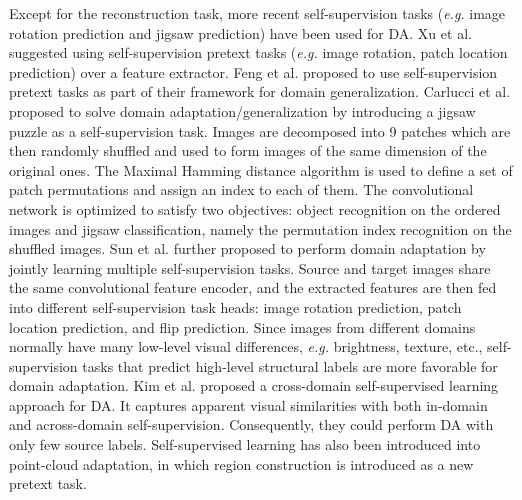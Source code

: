 \documentclass[conference]{IEEEtran}
\begin{document}
Except for the reconstruction task, more recent self-supervision tasks (\textit{e.g.}
image rotation prediction and jigsaw prediction) have been used for DA.
Xu et al. suggested using self-supervision pretext tasks (\textit{e.g.} image rotation, patch 
location prediction) over a feature extractor.
Feng et al. proposed to use self-supervision pretext tasks as part of their framework
for domain generalization. 
Carlucci et al. proposed to solve domain adaptation/generalization by introducing 
a jigsaw puzzle as a self-supervision task. 
Images are decomposed into 9 patches which are then randomly shuffled and used to
form images of the same dimension of the original ones.
The Maximal Hamming distance algorithm is used to define a set of patch 
permutations and assign an index to each of them.
The convolutional network is optimized to satisfy two objectives:
object recognition on the ordered images and jigsaw classification, namely 
the permutation index recognition on the shuffled images.
Sun et al. further proposed to perform domain adaptation by jointly learning 
multiple self-supervision tasks.
Source and target images share the same convolutional feature encoder, 
and the extracted features are then fed into different self-supervision task heads:
image rotation prediction, patch location prediction, and flip prediction.
Since images from different domains normally have many low-level visual differences,
\textit{e.g.} brightness, texture, etc., self-supervision tasks that predict high-level 
structural labels are more favorable for domain adaptation.
Kim et al. proposed a cross-domain self-supervised learning approach 
for DA.
It captures apparent visual similarities with both in-domain and across-domain 
self-supervision. 
Consequently, they could perform DA with only few source labels.
Self-supervised learning has also been introduced into point-cloud adaptation,
in which region construction is introduced as a new pretext task. 
\end{document}
